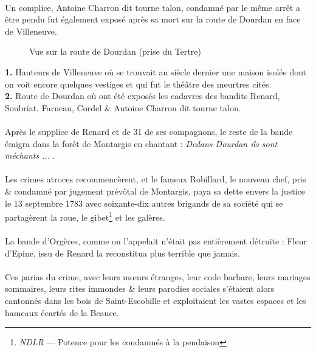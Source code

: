 \documentclass[../eBook.tex]{subfiles}
\begin{document}
      \paragraph{}Un complice, Antoine Charron dit tourne talon, condamné par le même arrêt a être pendu fut également exposé après sa mort sur la route de Dourdan en face de Villeneuve.
      \begin{center}
        \begin{figure}[!ht]
          \caption*{Vue sur la route de Dourdan (prise du Tertre)}
        \end{figure}
      \end{center}
      \small{}
      \noindent\textbf{1.} Hauteurs de Villeneuve où se trouvait au siècle dernier une maison isolée dont on voit encore quelques vestiges et qui fut le théâtre des meurtres cités.\\
      \textbf{2.} Route de Dourdan où ont été exposés les cadavres des bandits Renard, Soubriat, Farneau, Cordel \& Antoine Charron dit tourne talon.
      \normalsize{}
      \paragraph{}Après le supplice de Renard et de 31 de ses compagnons, le reste de la bande émigra dans la forêt de Montargis en chantant : \og \textit{Dedans Dourdan ils sont méchants ...} \fg{}.
      \paragraph{}Les crimes atroces recommencèrent, et le fameux Robillard, le nouveau chef, pris \& condamné par jugement prévôtal de Montargis, paya sa dette envers la justice le 13 septembre 1783 avec soixante-dix autres brigands de sa société qui se partagèrent la roue, le gibet\footnote{\textit{NDLR} --- Potence pour les condamnés à la pendaison} et les galères.
      \paragraph{}La bande d'Orgères, comme on l'appelait n'était pas entièrement détruite : Fleur d'Epine, issu de Renard la reconstitua plus terrible que jamais.
      \paragraph{}Ces parias du crime, avec leurs m\oe urs étranges, leur code barbare, leurs mariages sommaires, leurs rites immondes \& leurs parodies sociales s'étaient alors cantonnés dans les bois de Saint-Escobille et exploitaient les vastes espaces et les hameaux écartés de la Beauce.
\end{document}

